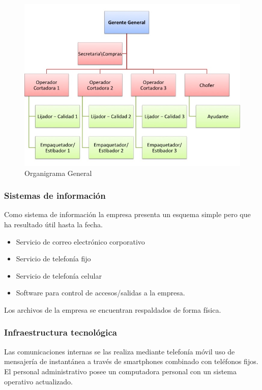 \documentclass[12pt, a4paper]{article}
\begin{document}
\begin{figure}[H]
 \centering
 \includegraphics[width=1\textwidth]{Organigrama.jpg}
 \captionsetup{justification=centering} %
 \caption{Organigrama General}
 \label{figura:4}
\end{figure}

\subsubsection {Sistemas de información}
Como sistema de información la empresa presenta un esquema simple pero que ha resultado útil hasta la fecha.

\begin{itemize}	
		\item Servicio de correo electrónico corporativo
		\item Servicio de telefonía fijo
		\item Servicio de telefonía celular
		\item Software para control de accesos/salidas a la empresa.
	\end{itemize}
Los archivos de la empresa se encuentran respaldados de forma física.

\subsubsection{Infraestructura tecnológica}
Las comunicaciones internas se las realiza mediante telefonía móvil uso de mensajería de instantánea a través de smartphones combinado con teléfonos fijos. El personal administrativo posee un computadora personal con un sistema operativo actualizado.
\end{document}
